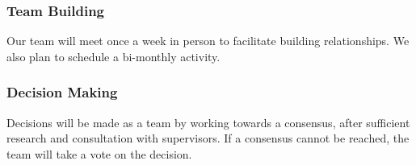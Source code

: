 \documentclass{article}
\begin{document}
\begin{comment}
\wss{You can set target metrics for attendance, commits, etc.  What are the
consequences if someone doesn't hit their targets?  Do they need to bring the
coffee to the next team meeting?  Does the team need to make an appointment with
their TA, or the instructor?  Are there incentives for reaching targets early?}
\end{comment}

\subsubsection*{Team Building}

\begin{comment}
\wss{How will you build team cohesion (fun time, group rituals, etc.)? }
\end{comment}
Our team will meet once a week in person to facilitate building relationships. We also plan to schedule a bi-monthly activity. 
\subsubsection*{Decision Making} 

\begin{comment}
\wss{How will you make decisions in your group? Consensus?  Vote? How will you
handle disagreements? }

\end{comment}
Decisions will be made as a team by working towards a consensus, after sufficient research and consultation with supervisors. If a consensus cannot be reached, the team will take a vote on the decision.
\end{document}

